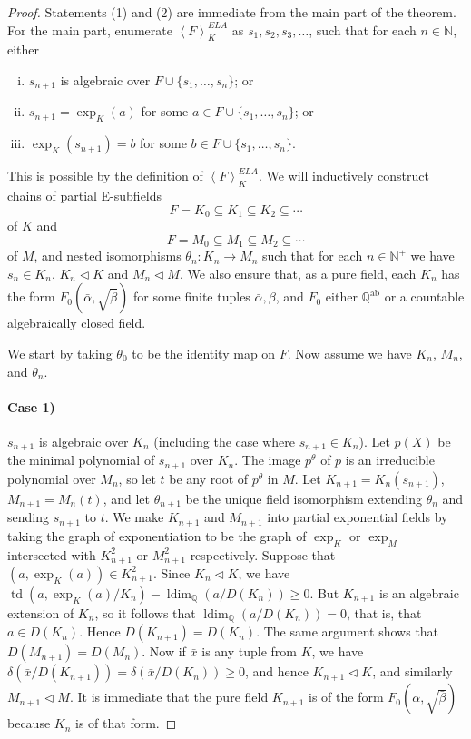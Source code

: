\documentclass[12pt]{amsart}
\theoremstyle{definition}
\begin{document}
\begin{proof}
  Statements (1) and (2) are immediate from the main part of the theorem. For the main part, enumerate ${\ensuremath{\left\langle {F} \right\rangle}}_K^{ELA}$ as $s_1,s_2,s_3,\ldots$, such that for each $n \in {\ensuremath{\mathbb{N}}}$, either
\begin{enumerate}[i)]
 \item $s_{n+1}$ is algebraic over $F \cup \{s_1,\ldots,s_n\}$; or
 \item $s_{n+1} = \exp_K(a)$ for some $a \in F \cup \{s_1,\ldots,s_n\}$; or
 \item $\exp_K(s_{n+1}) = b$ for some $b\in F \cup \{s_1,\ldots,s_n\}$.
\end{enumerate}
This is possible by the definition of ${\ensuremath{\left\langle {F} \right\rangle}}_K^{ELA}$. We will inductively construct chains of partial E-subfields \[F= K_0 {\subseteq} K_1 {\subseteq} K_2 {\subseteq} \cdots\]
 of $K$ and
\[F= M_0 {\subseteq} M_1 {\subseteq} M_2 {\subseteq} \cdots\]
of $M$, and nested isomorphisms $\theta_n: K_n \to M_n$ such that for each $n \in {\ensuremath{\mathbb{N}}}^+$ we have $s_n \in K_n$, $K_n {\ensuremath{\lhd}} K$ and $M_n {\ensuremath{\lhd}} M$. We also ensure that, as a pure field, each $K_n$ has the form $F_0(\bar{\alpha},\sqrt{\bar{\beta}})$ for some finite tuples $\bar{\alpha},\bar{\beta}$, and $F_0$ either ${{\ensuremath{\mathbb{Q}}}^{\mathrm{ab}}}$ or a countable algebraically closed field.

We start by taking $\theta_0$ to be the identity map on $F$. Now assume we have $K_n$, $M_n$, and $\theta_n$.
\paragraph{Case 1)} $s_{n+1}$ is algebraic over $K_n$ (including the case where $s_{n+1} \in K_n$). Let $p(X)$ be the minimal polynomial of $s_{n+1}$ over $K_n$. The image $p^\theta$ of $p$ is an irreducible polynomial over $M_n$, so let $t$ be any root of $p^\theta$ in $M$. Let $K_{n+1} = K_n(s_{n+1})$, $M_{n+1} = M_n(t)$, and let $\theta_{n+1}$ be the unique field isomorphism extending $\theta_n$ and sending $s_{n+1}$ to $t$. We make $K_{n+1}$ and $M_{n+1}$ into partial exponential fields by taking the graph of exponentiation to be the graph of $\exp_K$ or $\exp_M$ intersected with $K_{n+1}^2$ or $M_{n+1}^2$ respectively. Suppose that $(a,\exp_K(a)) \in K_{n+1}^2$. Since $K_n {\ensuremath{\lhd}} K$, we have $\operatorname{td}(a,\exp_K(a)/K_n) - \operatorname{ldim}_{\ensuremath{\mathbb{Q}}}(a/D(K_n)) {\ensuremath{\geqslant}} 0$. But $K_{n+1}$ is an algebraic extension of $K_n$, so it follows that $\operatorname{ldim}_{\ensuremath{\mathbb{Q}}}(a/D(K_n)) = 0$, that is, that $a \in D(K_n)$. Hence $D(K_{n+1}) = D(K_n)$. The same argument shows that $D(M_{n+1}) = D(M_n)$. Now if ${{\ensuremath{\bar{x}}}}$ is any tuple from $K$, we have $\delta({{\ensuremath{\bar{x}}}}/D(K_{n+1})) = \delta({{\ensuremath{\bar{x}}}}/D(K_n)) {\ensuremath{\geqslant}} 0$, and hence $K_{n+1} {\ensuremath{\lhd}} K$, and similarly $M_{n+1} {\ensuremath{\lhd}} M$. It is immediate that the pure field $K_{n+1}$ is of the form $F_0(\bar{\alpha},\sqrt{\bar{\beta}})$ because $K_n$ is of that form.


\end{proof}
\end{document}
